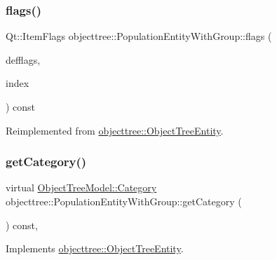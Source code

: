 \mbox{\label{classobjecttree_1_1_population_entity_with_group_ae9b985951942efd8df58717d89cb9a35}} 
\subsubsection{\texorpdfstring{flags()}{flags()}}
{\footnotesize\ttfamily Qt\+::\+Item\+Flags objecttree\+::\+Population\+Entity\+With\+Group\+::flags (\begin{DoxyParamCaption}\item[{Qt\+::\+Item\+Flags}]{defflags,  }\item[{const Q\+Model\+Index \&}]{index }\end{DoxyParamCaption}) const\hspace{0.3cm}{\ttfamily [virtual]}}



Reimplemented from \mbox{\hyperlink{classobjecttree_1_1_object_tree_entity_a71042bfb5a8328bcbde9d283c0b1b28c}{objecttree\+::\+Object\+Tree\+Entity}}.

\mbox{\label{classobjecttree_1_1_population_entity_with_group_a782b6b4b4b316981bd709293b479f9b1}} 
\subsubsection{\texorpdfstring{getCategory()}{getCategory()}}
{\footnotesize\ttfamily virtual \mbox{\hyperlink{class_object_tree_model_a379e9d6b0d381853785adf62095ba4e3}{Object\+Tree\+Model\+::\+Category}} objecttree\+::\+Population\+Entity\+With\+Group\+::get\+Category (\begin{DoxyParamCaption}{ }\end{DoxyParamCaption}) const\hspace{0.3cm}{\ttfamily [inline]}, {\ttfamily [virtual]}}



Implements \mbox{\hyperlink{classobjecttree_1_1_object_tree_entity_aa4e80e7fa80672c1b9902add665abc77}{objecttree\+::\+Object\+Tree\+Entity}}.

